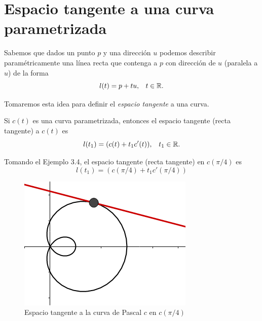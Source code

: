\section{Espacio tangente a una curva parametrizada}

Sabemos que dados un punto $p$ y una direcci\'on $u$ podemos describir param\'etricamente una
l\'inea recta que contenga a $p$ con direcci\'on de $u$ (paralela a $u$) de la forma
$$ l(t) = p + tu \text{,} \quad t \in \mathbb{R} \text{.}$$

Tomaremos esta idea para definir el \emph{espacio tangente} a una curva.

\begin{definition}
    Si $c(t)$ es una curva parametrizada, entonces el espacio tangente (recta tangente) a $c(t)$ es
    $$ l(t_{1}) = ( c(t) + t_{1}c'(t) ) \text{,} \quad t_{1} \in \mathbb{R} \text{.}$$
\end{definition}

\begin{myExample}
    Tomando el Ejemplo 3.4, el espacio tangente (recta tangente) en $c(\pi/4)$ es
    $$ l(t_{1}) = (c(\pi/4) + t_{1}c'(\pi/4)) $$
\end{myExample}

\begin{figure}[!ht]
  \begin{center}
      \includegraphics[width=0.8\linewidth]{gfx/limacon}
      \caption{Espacio tangente a la curva de Pascal $c$ en $c(\pi/4)$}
      \label{fig:boat1}
  \end{center}
\end{figure}


